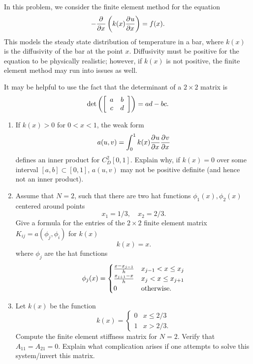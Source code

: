 In this problem, we consider the finite element method for the equation
\[
-\frac{\partial^{} }{\partial x^{}}\left(k(x)\frac{\partial^{} u}{\partial x^{}}\right) = f(x).
\]
This models the steady state distribution of temperature in a bar, where $k(x)$ is the diffusivity of the bar at the point $x$.  Diffusivity must be positive for the equation to be physically realistic; however, if $k(x)$ is not positive, the finite element method may run into issues as well.  

It may be helpful to use the fact that the determinant of a $2\times 2$ matrix is
\[
{\rm det}\left(\left[
\begin{array}{cc}
a &b\\
c &d
\end{array}
\right]\right) = ad-bc.
\]

\begin{enumerate}
\item If $k(x) > 0$ for $0 < x < 1$, the weak form
\[
a(u,v) = \int_0^1 k(x)\frac{\partial^{} u}{\partial x^{}}\frac{\partial^{} v}{\partial x^{}}
\]
defines an inner product for $C^2_D[0,1]$.  Explain why, if $k(x) = 0$ over some interval $[a,b] \subset [0,1]$, $a(u,v)$ may not be positive definite (and hence not an inner product).  
\item Assume that $N = 2$, such that there are two hat functions $\phi_1(x),\phi_2(x)$ centered around points 
\[
x_1 = 1/3, \quad x_2 = 2/3.
\]
Give a formula for the entries of the $2\times 2$ finite element matrix $K_{ij} = a(\phi_j,\phi_i)$ for $k(x)$
\[
k(x) = x.
\]
where $\phi_j$ are the hat functions
\[
\phi_j(x) = \begin{cases}
\frac{x-x_{j-1}}{h} & x_{j-1} < x \leq x_j\\
\frac{x_{j+1}-x}{h} & x_{j} < x \leq x_{j+1}\\
0 & {\rm otherwise}.
\end{cases}
\]

\item Let $k(x)$ be the function
\[
k(x) = \begin{cases}
0 & x \leq 2/3\\
1 & x > 2/3.
\end{cases}
\]
Compute the finite element stiffness matrix for $N=2$.  Verify that $A_{11} = A_{21} = 0$.  
Explain what complication arises if one attempts to solve this system/invert this matrix.  %
\end{enumerate}